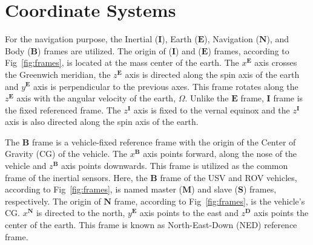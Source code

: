 \documentclass[3p]{elsarticle}
\begin{document}
\section{Coordinate Systems}\label{sec:coordinate}
\noindent For the navigation purpose, the Inertial (\(\mathbf{I}\)), Earth (\(\mathbf{E}\)), Navigation (\(\mathbf{N}\)), and Body (\(\mathbf{B}\)) frames are utilized.
The origin of (\(\mathbf{I}\)) and (\(\mathbf{E}\)) frames, according to Fig~\ref{fig:frames}, is located at the mass center of the earth.
The \(x^{\mathbf{E}}\) axis crosses the Greenwich meridian, the \(z^{\mathbf{E}}\) axis is directed along the spin axis of the earth and \(y^{\mathbf{E}}\) axis is perpendicular to the previous axes. This frame rotates along the \(z^{\mathbf{E}}\) axis with the angular velocity of the earth, \(\Omega\). Unlike the \(\mathbf{E}\) frame, \(\mathbf{I}\) frame is the fixed referenced frame. The \(z^{\mathbf{I}}\) axis is fixed to the vernal equinox and the \(z^{\mathbf{I}}\) axis is also directed along the spin axis of the earth.

The \(\mathbf{B}\) frame is a vehicle-fixed reference frame with the origin of the Center of Gravity (CG) of the vehicle.
The \(x^{\mathbf{B}}\) axis points forward, along the nose of the vehicle and \(z^{\mathbf{B}}\) axis points downwards.
This frame is utilized as the common frame of the inertial sensors.
Here, the \(\mathbf{B}\) frame of the USV and ROV vehicles, according to Fig~\ref{fig:frames}, is named master (\(\mathbf{M}\)) and slave (\(\mathbf{S}\)) frames, respectively.
The origin of \(\mathbf{N}\) frame, according to Fig~\ref{fig:frames}, is the vehicle's CG\@. \(x^{\mathbf{N}}\) is directed to the north, \(y^{\mathbf{E}}\) axis points to the east and \(z^{\mathbf{D}}\) axis points the center of the earth. This frame is known as North-East-Down (NED) reference frame.







\end{document}
